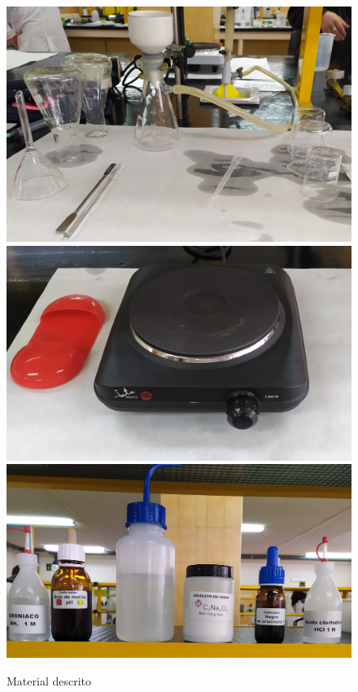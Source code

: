 \begin{figure}[H]
    \centering
    \hspace*{-3cm}
        \includegraphics[scale = 0.049]{fotos/set4.jpg}
        \includegraphics[scale = 0.0673]{fotos/placa4.jpg}
        \includegraphics[scale = 0.058]{fotos/liqui4.jpg}
    \hspace*{-3cm}
    \caption{Material descrito}
\end{figure}
\vspace{-3cm}
\clearpage

